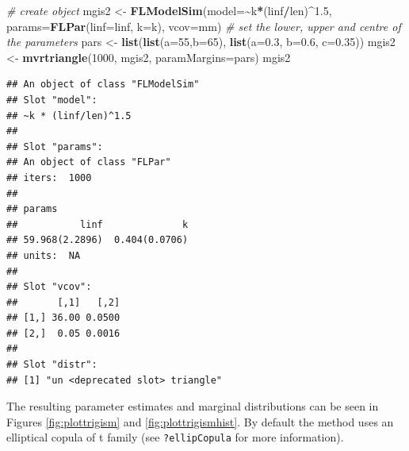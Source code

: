 \documentclass[
]{book}
\newenvironment{Shaded}{\begin{snugshade}}{\end{snugshade}}
\newcommand{\AttributeTok}[1]{\textcolor[rgb]{0.13,0.29,0.53}{#1}}
\newcommand{\CommentTok}[1]{\textcolor[rgb]{0.56,0.35,0.01}{\textit{#1}}}
\newcommand{\DecValTok}[1]{\textcolor[rgb]{0.00,0.00,0.81}{#1}}
\newcommand{\FloatTok}[1]{\textcolor[rgb]{0.00,0.00,0.81}{#1}}
\newcommand{\FunctionTok}[1]{\textcolor[rgb]{0.13,0.29,0.53}{\textbf{#1}}}
\newcommand{\NormalTok}[1]{#1}
\newcommand{\OtherTok}[1]{\textcolor[rgb]{0.56,0.35,0.01}{#1}}
\newcommand{\SpecialCharTok}[1]{\textcolor[rgb]{0.81,0.36,0.00}{\textbf{#1}}}
\begin{document}
\begin{Shaded}
\begin{Highlighting}[]
\CommentTok{\# create object}
\NormalTok{mgis2 }\OtherTok{\textless{}{-}} \FunctionTok{FLModelSim}\NormalTok{(}\AttributeTok{model=}\SpecialCharTok{\textasciitilde{}}\NormalTok{k}\SpecialCharTok{*}\NormalTok{(linf}\SpecialCharTok{/}\NormalTok{len)}\SpecialCharTok{\^{}}\FloatTok{1.5}\NormalTok{, }\AttributeTok{params=}\FunctionTok{FLPar}\NormalTok{(}\AttributeTok{linf=}\NormalTok{linf, }\AttributeTok{k=}\NormalTok{k), }\AttributeTok{vcov=}\NormalTok{mm)}
\CommentTok{\# set the lower, upper and centre of the parameters}
\NormalTok{pars }\OtherTok{\textless{}{-}} \FunctionTok{list}\NormalTok{(}\FunctionTok{list}\NormalTok{(}\AttributeTok{a=}\DecValTok{55}\NormalTok{,}\AttributeTok{b=}\DecValTok{65}\NormalTok{), }\FunctionTok{list}\NormalTok{(}\AttributeTok{a=}\FloatTok{0.3}\NormalTok{, }\AttributeTok{b=}\FloatTok{0.6}\NormalTok{, }\AttributeTok{c=}\FloatTok{0.35}\NormalTok{))}
\NormalTok{mgis2 }\OtherTok{\textless{}{-}} \FunctionTok{mvrtriangle}\NormalTok{(}\DecValTok{1000}\NormalTok{, mgis2, }\AttributeTok{paramMargins=}\NormalTok{pars)}
\NormalTok{mgis2}
\end{Highlighting}
\end{Shaded}

\begin{verbatim}
## An object of class "FLModelSim"
## Slot "model":
## ~k * (linf/len)^1.5
## 
## Slot "params":
## An object of class "FLPar"
## iters:  1000 
## 
## params
##           linf              k 
## 59.968(2.2896)  0.404(0.0706) 
## units:  NA 
## 
## Slot "vcov":
##       [,1]   [,2]
## [1,] 36.00 0.0500
## [2,]  0.05 0.0016
## 
## Slot "distr":
## [1] "un <deprecated slot> triangle"
\end{verbatim}

The resulting parameter estimates and marginal distributions can be seen in Figures \ref{fig:plottrigism} and \ref{fig:plottrigismhist}. By default the method uses an elliptical copula of t family (see \texttt{?ellipCopula} for more information).
\end{document}
